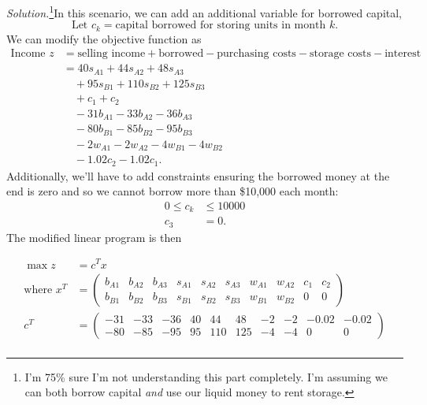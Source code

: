 \documentclass{homework}
\begin{document}
\begin{enumerate}
\begin{enumerate}
			
			\textit{Solution.}\footnote{I'm 75\% sure I'm not understanding this part completely. I'm assuming we can both borrow capital \textit{and} use our liquid money to rent storage.}\quad In this scenario, we can add an additional variable for borrowed capital, 
			$$\text{Let } c_k = \text{capital borrowed for storing units in month $k$}.$$
			We can modify the objective function as 
			\begin{align*}
			\text{Income } z & = \text{selling income} + \text{borrowed} - \text{purchasing costs} - \text{storage costs} - \text{interest} \\
				& = 40 s_{A1} + 44 s_{A2} + 48 s_{A3} \\
				& \quad + 95 s_{B1} + 110 s_{B2} + 125 s_{B3} \\
				& \quad + c_1 + c_2 \\
				& \quad - 31 b_{A1} - 33 b_{A2} - 36 b_{A3} \\
				& \quad - 80 b_{B1} - 85 b_{B2} - 95 b_{B3} \\
				& \quad - 2 w_{A1} - 2 w_{A2} - 4 w_{B1} - 4 w_{B2} \\
				& \quad - 1.02 c_{2} - 1.02 c_1.
			\end{align*}
			Additionally, we'll have to add constraints ensuring the borrowed money at the end is zero and so we cannot borrow more than \$10,000 each month: \begin{align*}
				0 \le c_k & \le 10000 \\
				c_3 & = 0.
			\end{align*}
			The modified linear program is then 
			\begin{tcolorbox}
				\vspace{-1em}
				\begin{align*}
					\max z & = c^T x \\
					\text{where } x^T & = \begin{pmatrix}
						b_{A1}  & b_{A2} & b_{A3} & s_{A1} & s_{A2} & s_{A3} & w_{A1} & w_{A2} & c_1 & c_2 \\
						b_{B1}  & b_{B2} & b_{B3} & s_{B1} & s_{B2} & s_{B3} & w_{B1} & w_{B2} & 0 & 0
					\end{pmatrix} \\
					c^T & = \begin{pmatrix}
						-31 & -33 & -36 & 40 & 44 & 48 & -2 & -2 & -0.02 & -0.02\\
						-80 & -85 & -95 & 95 & 110 & 125 & -4 & -4 & 0 & 0
					\end{pmatrix} \\

\end{align*}
\end{tcolorbox}
\end{enumerate}
\end{enumerate}
\end{document}
